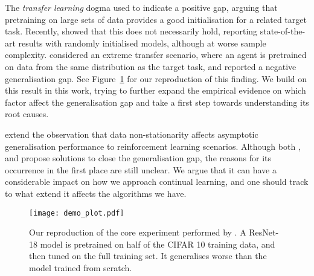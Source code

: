 %
The \textit{transfer learning} dogma used to indicate a positive gap, arguing that pretraining on large sets of data provides a good initialisation for a related target task.
Recently, \cite{he2019rethinking} showed that this does not necessarily hold,
reporting state-of-the-art results with randomly initialised models, although 
at worse sample complexity.
\cite{ash2019difficulty} considered an extreme transfer scenario, where an agent is pretrained on data from the same distribution as the target task, and reported a negative generalisation gap. See Figure~\ref{fig:demo} for our reproduction of this finding. We build on this result in this work, trying to further expand the empirical evidence on which factor affect the generalisation gap and take a first step towards understanding its root causes.



\citeauthor{igl2021transient} extend the observation that data non-stationarity affects asymptotic generalisation performance to reinforcement learning scenarios. Although both \citeauthor{ash2019difficulty}, and \citeauthor{igl2021transient} propose solutions to close the generalisation gap, the reasons for its occurrence in the first place are still unclear.
We argue that it can have a considerable impact on how we approach continual learning, and one should track to what extend it affects the algorithms we have.


\begin{figure}
    \centering
    \texttt{[image: demo\_plot.pdf]}
    \caption{Our reproduction of the core experiment performed by \cite{ash2019difficulty}. A ResNet-18 model is pretrained on half of the CIFAR 10 training data, and then tuned on the full training set. It generalises worse than the model trained from scratch.}
    \label{fig:demo}
\end{figure}

